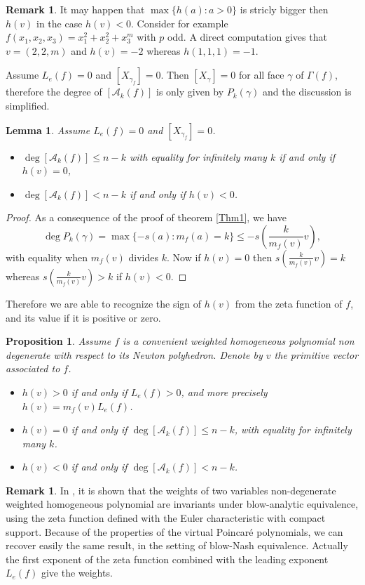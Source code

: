 \documentclass[12pt,a4paper,leqno]{amsart}
\newtheorem{lem}[thm]{Lemma}
\newtheorem{prop}[thm]{Proposition}
\theoremstyle{definition}
\newtheorem{rem}[thm]{Remark}
\begin{document}
\begin{rem} It may happen that $\max \{h(a):a>0\}$ is stricly bigger
  then $h(v)$ in the case $h(v)<0$. Consider for example
  $f(x_1,x_2,x_3)=x_1^2+x_2^2+x_3^m$ with $p$ odd. A direct
  computation gives that $v=(2,2,m)$
  and $h(v)=-2$ whereas $h(1,1,1)=-1$.
\end{rem}

Assume $L_e(f)=0$ and $[X_{\gamma_f}]= 0$. Then  $[X_{\gamma}]= 0$ for
all face $\gamma$ of $\Gamma (f)$, therefore the degree of $[\mathcal A_k(f)]$ is only
given by $P_k(\gamma)$ and the discussion is simplified. 

\begin{lem} Assume $L_e(f)=0$ and $[X_{\gamma_f}]= 0$. 
\begin{itemize}
\item $\deg [\mathcal A_k(f)]\leq n-k$ with equality for infinitely
  many $k$ if and only if $h(v)=0$,
\item $\deg [\mathcal A_k(f)]<n-k$ if and only if $h(v)<0$.
\end{itemize}
\end{lem}

\begin{proof} As a consequence of the proof of theorem \ref{Thm1}, we
  have
$$\deg P_k(\gamma)=\max\{-s(a): m_f(a)=k\} \leq
-s(\frac{k}{m_f(v)}v),$$
with equality when $m_f(v)$ divides $k$. Now if $h(v)=0$ then
$s(\frac{k}{m_f(v)}v)=k$ whereas $s(\frac{k}{m_f(v)}v)>k$ if $h(v)<0$.
\end{proof}

Therefore we are able to recognize the sign of $h(v)$ from the zeta
function of $f$, and its value if it is positive or zero.

\begin{prop}\label{signh} Assume $f$ is a convenient weighted homogeneous
  polynomial non degenerate with respect to its Newton
  polyhedron. Denote by $v$ the primitive vector associated to $f$.
\begin{itemize}
\item $h(v)>0$ if and only if $L_e(f)>0$, and more precisely $h(v)=m_f(v)L_e(f)$.
\item $h(v)=0$ if and only if $\deg [\mathcal A_k(f)]\leq n-k$, with equality for infinitely
  many $k$.
\item $h(v)<0$ if and only if $\deg [\mathcal A_k(f)]<n-k$.
\end{itemize}
\end{prop}

\begin{rem}\label{2-case} In \cite{Ould}, it is shown that the weights of two
  variables non-degenerate weighted homogeneous polynomial are
  invariants under blow-analytic equivalence, using the zeta function
  defined with the Euler characteristic with compact support. Because
  of the properties of the virtual Poincar\'e polynomials, we can
  recover easily the same result, in the setting of blow-Nash
  equivalence. Actually the first exponent of the zeta function
  combined with the leading exponent $L_e(f)$ give the weights.
\end{rem}
\end{document}
